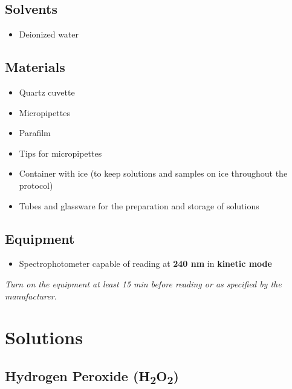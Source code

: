 \documentclass[
  9pt,
  american,
  a5paper,
  extrafontsizes,onecolumn,openright
  ]{memoir}
\providecommand{\tightlist}{%
  \setlength{\itemsep}{0pt}\setlength{\parskip}{0pt}}
\begin{document}
\subsection{Solvents}\label{solvents}

\begin{itemize}
\tightlist
\item
  Deionized water
\end{itemize}

\subsection{Materials}\label{materials}

\begin{itemize}
\tightlist
\item
  Quartz cuvette
\item
  Micropipettes
\item
  Parafilm
\item
  Tips for micropipettes
\item
  Container with ice (to keep solutions and samples on ice throughout the protocol)
\item
  Tubes and glassware for the preparation and storage of solutions
\end{itemize}

\subsection{Equipment}\label{equipment}

\begin{itemize}
\tightlist
\item
  Spectrophotometer capable of reading at \textbf{240 nm} in \textbf{kinetic mode}
\end{itemize}

\begin{greybox}[frametitle=Note]
\emph{Turn on the equipment at least 15 min before reading or as specified by the manufacturer.}

\end{greybox}

\section{Solutions}\label{solutions}

\subsection{\texorpdfstring{Hydrogen Peroxide (H\textsubscript{2}O\textsubscript{2})}{Hydrogen Peroxide (H2O2)}}\label{hydrogen-peroxide-h2o2}
\end{document}
